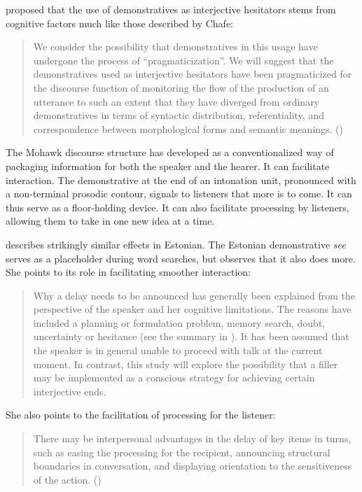 \documentclass[output=paper]{langscibook}
\begin{document}
\citet{HayashiYoon2006} proposed that the use of demonstratives as interjective hesitators stems from cognitive factors much like those described by Chafe:

\begin{quote}
We consider the possibility that demonstratives in this usage have undergone the process of “pragmaticization”. We will suggest that the demonstratives used as interjective hesitators have been pragmaticized for the discourse function of monitoring the flow of the production of an utterance to such an extent that they have diverged from ordinary demonstratives in terms of syntactic distribution, referentiality, and correspondence between morphological forms and semantic meanings. (\citealt[488]{HayashiYoon2006})
\end{quote}

The Mohawk discourse structure has developed as a conventionalized way of packaging information for both the speaker and the hearer. It can facilitate interaction. The demonstrative at the end of an intonation unit, pronounced with a non-terminal prosodic contour, signals to listeners that more is to come. It can thus serve as a floor-holding device. It can also facilitate processing by listeners, allowing them to take in one new idea at a time.

\citet{Keevallik2010} describes strikingly similar effects in Estonian. The Estonian demonstrative \textit{see} serves as a placeholder during word searches, but \citeauthor{Keevallik2010} observes that it also does more. She points to its role in facilitating smoother interaction:

\begin{quote}
Why a delay needs to be announced has generally been explained from the perspective of the speaker and her cognitive limitations. The reasons have included a planning or formulation problem, memory search, doubt, uncertainty or hesitance (see the summary in \citealt[90]{Tree2002}). It has been assumed that the speaker is in general unable to proceed with talk at the current moment. In contrast, this study will explore the possibility that a filler may be implemented as a conscious strategy for achieving certain interjective ends. \citep[139]{Keevallik2010}
\end{quote}

She also points to the facilitation of processing for the listener:

\begin{quote}
There may be interpersonal advantages in the delay of key items in turns, such as easing the processing for the recipient, announcing structural boundaries in conversation, and displaying orientation to the sensitiveness of the action. (\citeyear[139]{Keevallik2010})
\end{quote}
\end{document}
